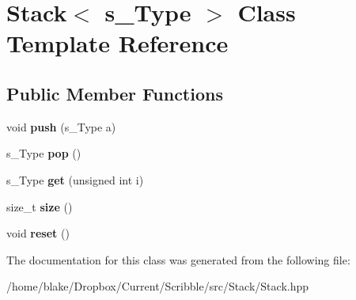 \hypertarget{class_stack}{\section{Stack$<$ s\-\_\-\-Type $>$ Class Template Reference}
\label{class_stack}
}
\subsection*{Public Member Functions}
\begin{DoxyCompactItemize}
\item 
\hypertarget{class_stack_a458c3a1083e133a2bca0e5cb4aa8bcb9}{void {\bfseries push} (s\-\_\-\-Type a)}\label{class_stack_a458c3a1083e133a2bca0e5cb4aa8bcb9}

\item 
\hypertarget{class_stack_a78bb9fa57bd39e0e76bc5231870afa04}{s\-\_\-\-Type {\bfseries pop} ()}\label{class_stack_a78bb9fa57bd39e0e76bc5231870afa04}

\item 
\hypertarget{class_stack_af2960e123bfbf1928b1d8058378dc81a}{s\-\_\-\-Type {\bfseries get} (unsigned int i)}\label{class_stack_af2960e123bfbf1928b1d8058378dc81a}

\item 
\hypertarget{class_stack_a41b54c9ef621409d6125b99fc566a659}{size\-\_\-t {\bfseries size} ()}\label{class_stack_a41b54c9ef621409d6125b99fc566a659}

\item 
\hypertarget{class_stack_aeecf55b18f487aa18e278a5d9f3c3e7f}{void {\bfseries reset} ()}\label{class_stack_aeecf55b18f487aa18e278a5d9f3c3e7f}

\end{DoxyCompactItemize}


The documentation for this class was generated from the following file\-:\begin{DoxyCompactItemize}
\item 
/home/blake/\-Dropbox/\-Current/\-Scribble/src/\-Stack/Stack.\-hpp\end{DoxyCompactItemize}

